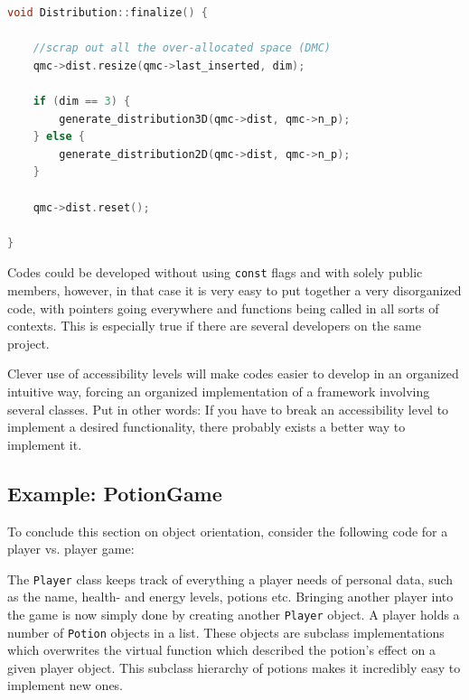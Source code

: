 \begin{lstlisting}[language=c++]
void Distribution::finalize() {

    //scrap out all the over-allocated space (DMC)
    qmc->dist.resize(qmc->last_inserted, dim);

    if (dim == 3) {
        generate_distribution3D(qmc->dist, qmc->n_p);
    } else {
        generate_distribution2D(qmc->dist, qmc->n_p);
    }

    qmc->dist.reset();

}
\end{lstlisting}

Codes could be developed without using \verb+const+ flags and with solely public members, however, in that case it is very easy to put together a very disorganized code, with pointers going everywhere and functions being called in all sorts of contexts. This is especially true if there are several developers on the same project. 

Clever use of accessibility levels will make codes easier to develop in an organized intuitive way, forcing an organized implementation of a framework involving several classes. Put in other words: If you have to break an accessibility level to implement a desired functionality, there probably exists a better way to implement it.


\subsection{Example: PotionGame}
\label{sec:PotionGame}

To conclude this section on object orientation, consider the following code for a player vs. player game:
\clearpage

\vspace{0.5 cm}

\clearpage


The \verb+Player+ class keeps track of everything a player needs of personal data, such as the name, health- and  energy levels, potions etc. Bringing another player into the game is now simply done by creating another \verb+Player+ object. A player holds a number of \verb+Potion+ objects in a list. These objects are subclass implementations which overwrites the virtual function which described the potion's effect on a given player object. This subclass hierarchy of potions makes it incredibly easy to implement new ones.

